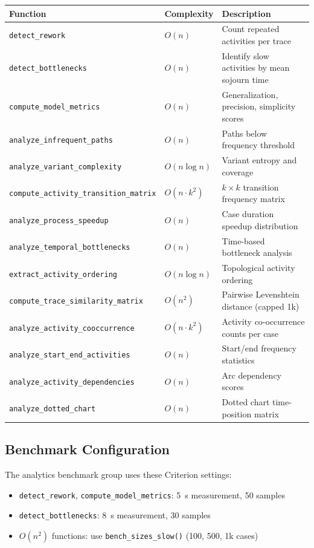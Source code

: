 \documentclass[11pt,a4paper]{article}
\begin{document}
\begin{longtable}{@{}lll@{}}
\toprule
\textbf{Function} & \textbf{Complexity} & \textbf{Description} \\
\midrule
\endhead
\texttt{detect\_rework}           & $O(n)$      & Count repeated activities per trace \\
\texttt{detect\_bottlenecks}      & $O(n)$      & Identify slow activities by mean sojourn time \\
\texttt{compute\_model\_metrics}  & $O(n)$      & Generalization, precision, simplicity scores \\
\texttt{analyze\_infrequent\_paths} & $O(n)$    & Paths below frequency threshold \\
\texttt{analyze\_variant\_complexity} & $O(n \log n)$ & Variant entropy and coverage \\
\texttt{compute\_activity\_transition\_matrix} & $O(n \cdot k^2)$ &
  $k \times k$ transition frequency matrix \\
\texttt{analyze\_process\_speedup} & $O(n)$     & Case duration speedup distribution \\
\texttt{analyze\_temporal\_bottlenecks} & $O(n)$ & Time-based bottleneck analysis \\
\texttt{extract\_activity\_ordering} & $O(n \log n)$ & Topological activity ordering \\
\texttt{compute\_trace\_similarity\_matrix} & $O(n^2)$ &
  Pairwise Levenshtein distance (capped 1k) \\
\texttt{analyze\_activity\_cooccurrence} & $O(n \cdot k^2)$ &
  Activity co-occurrence counts per case \\
\texttt{analyze\_start\_end\_activities} & $O(n)$ & Start/end frequency statistics \\
\texttt{analyze\_activity\_dependencies} & $O(n)$ & Arc dependency scores \\
\texttt{analyze\_dotted\_chart}   & $O(n)$      & Dotted chart time-position matrix \\
\bottomrule
\end{longtable}

\subsection{Benchmark Configuration}

The analytics benchmark group uses these Criterion settings:

\begin{itemize}
  \item \texttt{detect\_rework}, \texttt{compute\_model\_metrics}: 5~s measurement, 50 samples
  \item \texttt{detect\_bottlenecks}: 8~s measurement, 30 samples
  \item $O(n^2)$ functions: use \texttt{bench\_sizes\_slow()} (100, 500, 1k cases)
\end{itemize}
\end{document}
